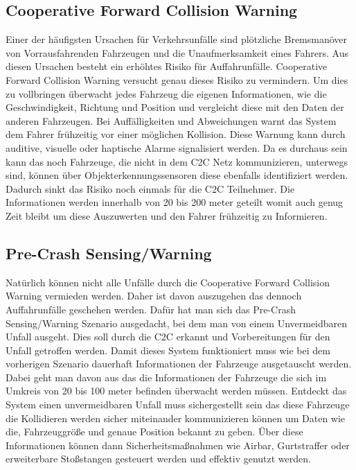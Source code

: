 \subsection{Cooperative Forward Collision Warning}
Einer der häufigsten Ursachen für Verkehrsunfälle sind plötzliche Bremsmanöver von Vorrausfahrenden Fahrzeugen und die Unaufmerksamkeit eines Fahrers. Aus diesen Ursachen besteht ein erhöhtes Risiko für Auffahrunfälle. Cooperative Forward Collision Warning versucht genau dieses Risiko zu vermindern. Um dies zu vollbringen überwacht jedes Fahrzeug die eigenen Informationen, wie die Geschwindigkeit, Richtung und Position und vergleicht diese mit den Daten der anderen Fahrzeugen. Bei Auffälligkeiten und Abweichungen warnt das System dem Fahrer frühzeitig vor einer möglichen Kollision. Diese Warnung kann durch auditive, visuelle oder haptische Alarme signalisiert werden. Da es durchaus sein kann das noch Fahrzeuge, die nicht in dem C2C Netz kommunizieren, unterwegs sind, können über Objekterkennungssensoren diese ebenfalls identifiziert werden. Dadurch sinkt das Risiko noch einmals für die C2C Teilnehmer. Die Informationen werden innerhalb von 20 bis 200 meter geteilt womit auch genug Zeit bleibt um diese Auszuwerten und den Fahrer frühzeitig zu Informieren. 

\subsection{Pre-Crash Sensing/Warning}
Natürlich können nicht alle Unfälle durch die Cooperative Forward Collision Warning vermieden werden. Daher ist davon auszugehen das dennoch Auffahrunfälle geschehen werden. Dafür hat man sich das Pre-Crash Sensing/Warning Szenario ausgedacht, bei dem man von einem Unvermeidbaren Unfall ausgeht. Dies soll durch die \acl{C2C} erkannt und Vorbereitungen für den Unfall getroffen werden. Damit dieses System funktioniert muss wie bei dem vorherigen Szenario dauerhaft Informationen der Fahrzeuge ausgetauscht werden. Dabei geht man davon aus das die Informationen der Fahrzeuge die sich im Umkreis von 20 bis 100 meter befinden überwacht werden müssen. Entdeckt das System einen unvermeidbaren Unfall muss sichergestellt sein das diese Fahrzeuge die Kollidieren werden sicher miteinander kommunizieren können um Daten wie die, Fahrzeuggröße und genaue Position bekannt zu geben. Über diese Informationen können dann Sicherheitsmaßnahmen wie Airbar, Gurtstraffer oder erweiterbare Stoßstangen gesteuert werden und effektiv genutzt werden. 

